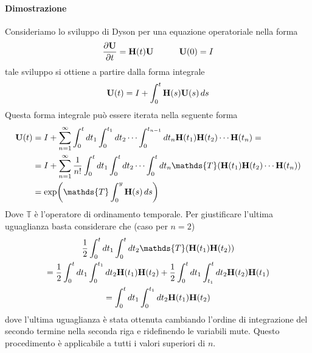 \documentclass[10pt,a4paper]{article}
\begin{document}
\paragraph{Dimostrazione}
Consideriamo lo sviluppo di Dyson per una equazione operatoriale nella forma
\begin{equation}
	\pdv{\vb{U}}{t} = \vb{H}(t)\vb{U} \quad\quad\quad \vb{U}(0) = I
\end{equation}
tale sviluppo si ottiene a partire dalla forma integrale
\begin{equation}
	\vb{U}(t) = I + \int_0^t \vb{H}(s)\vb{U}(s)\,ds
\end{equation}
Questa forma integrale può essere iterata nella seguente forma
\begin{align}
	\vb{U}(t) &= I + \sum_{n=1}^{\infty}\int_0^t dt_1 \int_0^{t_1} dt_2 \cdots \int_0^{t_{n-1}}dt_n \vb{H}(t_1) \vb{H}(t_2)\cdots \vb{H}(t_n) = \\
	&= I + \sum_{n=1}^{\infty} \frac{1}{n!} \int_0^t dt_1 \int_0^{t} dt_2 \cdots \int_0^{t}dt_n \mathds{T}(\vb{H}(t_1) \vb{H}(t_2)\cdots \vb{H}(t_n))\\
	&= \exp(\mathds{T} \int_0^y \vb{H}(s)\,ds)
\end{align}
Dove \(\mathds{T}\) è l'operatore di ordinamento temporale. Per giustificare l'ultima uguaglianza basta considerare che (caso per \(n=2\))
\begin{multline}
	\frac{1}{2} \int_0^t dt_1 \int_0^t dt_2 \mathds{T}(\vb{H}(t_1) \vb{H}(t_2)) \\
	=\frac{1}{2} \int_0^t dt_1 \int_0^{t_1} dt_2 \vb{H}(t_1) \vb{H}(t_2) + \frac{1}{2} \int_0^t dt_1 \int_{t_1}^{t} dt_2 \vb{H}(t_2) \vb{H}(t_1)\\
	=\int_0^t dt_1 \int_0^{t_1} dt_2 \vb{H}(t_1) \vb{H}(t_2)
\end{multline}
dove l'ultima uguaglianza è stata ottenuta cambiando l'ordine di integrazione del secondo termine nella seconda riga e ridefinendo le variabili mute. Questo procedimento è applicabile a tutti i valori superiori di \(n\).
\end{document}
